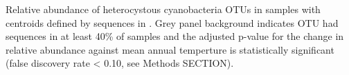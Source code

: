 Relative abundance of heterocystous cyanobacteria OTUs in \citet{Garcia_Pichel_2013} samples with centroids defined by sequences in \citet{Yeager}. Grey panel background indicates OTU had sequences in at least 40\% of samples and the adjusted p-value for the change in relative abundance against mean annual temperture is statistically significant (false discovery rate < 0.10, see Methods SECTION).
